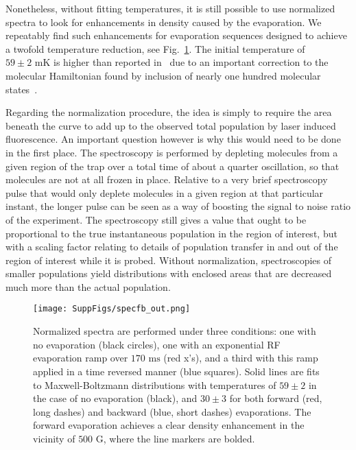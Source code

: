 \documentclass[%
 reprint,
 amsmath,amssymb,
 aps,
pra,
]{revtex4-1}
\begin{document}
Nonetheless, without fitting temperatures, it is still possible to use normalized spectra to look for enhancements in density caused by the evaporation.
We repeatably find such enhancements for evaporation sequences designed to achieve a twofold temperature reduction, see Fig.~\ref{fig:normenhance}.
The initial temperature of $59\pm2\text{ mK}$ is higher than reported in~\cite{Stuhl2012evap} due to an important correction to the molecular Hamiltonian found by inclusion of nearly one hundred molecular states~\cite{Maeda2015}.

Regarding the normalization procedure, the idea is simply to require the area beneath the curve to add up to the observed total population by laser induced fluorescence.
An important question however is why this would need to be done in the first place.
The spectroscopy is performed by depleting molecules from a given region of the trap over a total time of about a quarter oscillation, so that molecules are not at all frozen in place.
Relative to a very brief spectroscopy pulse that would only deplete molecules in a given region at that particular instant, the longer pulse can be seen as a way of boosting the signal to noise ratio of the experiment.
The spectroscopy still gives a value that ought to be proportional to the true instantaneous population in the region of interest, but with a scaling factor relating to details of population transfer in and out of the region of interest while it is probed.
Without normalization, spectroscopies of smaller populations yield distributions with enclosed areas that are decreased much more than the actual population.


\begin{figure}[tb]
\texttt{[image: SuppFigs/specfb\_out.png]}%
\caption{
Normalized spectra are performed under three conditions: one with no evaporation (black circles), one with an exponential RF evaporation ramp over $170\text{ ms}$ (red x's), and a third with this ramp applied in a time reversed manner (blue squares). Solid lines are fits to Maxwell-Boltzmann distributions with temperatures of $59\pm2$ in the case of no evaporation (black), and $30\pm3$ for both forward (red, long dashes) and backward (blue, short dashes) evaporations. The forward evaporation achieves a clear density enhancement in the vicinity of $500\text{ G}$, where the line markers are bolded. 
}
\label{fig:normenhance}
\end{figure}
\end{document}
